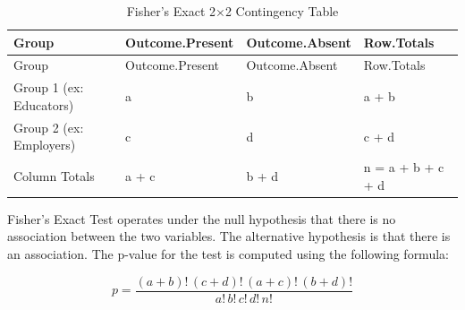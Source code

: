 \documentclass[
  11pt,
  letterpaper,
  DIV=11,
  numbers=noendperiod]{scrartcl}
\numberwithin{figure}{section}
\begin{document}
\begin{longtable}[]{@{}
  >{\raggedright\arraybackslash}p{}
  >{\raggedleft\arraybackslash}p{}
  >{\raggedleft\arraybackslash}p{}
  >{\raggedright\arraybackslash}p{}@{}}
\caption{Fisher's Exact 2×2 Contingency Table}\tabularnewline
\toprule\noalign{}
\begin{minipage}[b]{\linewidth}\raggedright
Group
\end{minipage} & \begin{minipage}[b]{\linewidth}\raggedleft
Outcome.Present
\end{minipage} & \begin{minipage}[b]{\linewidth}\raggedleft
Outcome.Absent
\end{minipage} & \begin{minipage}[b]{\linewidth}\raggedright
Row.Totals
\end{minipage} \\
\midrule\noalign{}
\endfirsthead
\toprule\noalign{}
\begin{minipage}[b]{\linewidth}\raggedright
Group
\end{minipage} & \begin{minipage}[b]{\linewidth}\raggedleft
Outcome.Present
\end{minipage} & \begin{minipage}[b]{\linewidth}\raggedleft
Outcome.Absent
\end{minipage} & \begin{minipage}[b]{\linewidth}\raggedright
Row.Totals
\end{minipage} \\
\midrule\noalign{}
\endhead
\bottomrule\noalign{}
\endlastfoot
Group 1 (ex: Educators) & a & b & a + b \\
Group 2 (ex: Employers) & c & d & c + d \\
Column Totals & a + c & b + d & n = a + b + c + d \\
\end{longtable}

Fisher's Exact Test operates under the null hypothesis that there is no
association between the two variables. The alternative hypothesis is
that there is an association. The p-value for the test is computed using
the following formula:

\[p = \frac{(a+b)! \, (c+d)! \, (a+c)! \, (b+d)!}{a! \, b! \, c! \, d! \, n!}\]
\end{document}
